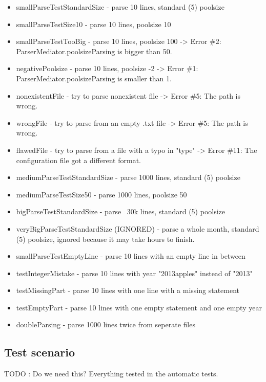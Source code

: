 \begin{itemize}

\item smallParseTestStandardSize - parse 10 lines, standard (5) poolsize
\item smallParseTestSize10 - parse 10 lines, poolsize 10
\item smallParseTestTooBig - parse 10 lines, poolsize 100 -> Error \#2: ParserMediator.poolsizeParsing is bigger than 50.
\item negativePoolsize - parse 10 lines, poolsize -2 -> Error \#1: ParserMediator.poolsizeParsing is smaller than 1.
\item nonexistentFile - try to parse nonexistent file -> Error \#5: The path is wrong.
\item wrongFile - try to parse from an empty .txt file -> Error \#5: The path is wrong.
\item flawedFile - try to parse from a file with a typo in "type" -> Error \#11: The configuration file got a different format.
\item mediumParseTestStandardSize - parse 1000 lines, standard (5) poolsize
\item mediumParseTestSize50 - parse 1000 lines, poolsize 50
\item bigParseTestStandardSize - parse ~30k lines, standard (5) poolsize
\item veryBigParseTestStandardSize (IGNORED) - parse a whole month, standard (5) poolsize, ignored because it may take hours 
to finish.
\item smallParseTestEmptyLine - parse 10 lines with an empty line in between
\item testIntegerMistake - parse 10 lines with year "2013apples" instead of "2013"
\item testMissingPart - parse 10 lines with one line with a missing statement
\item testEmptyPart - parse 10 lines with one empty statement and one empty year
\item doubleParsing - parse 1000 lines twice from seperate files

\end{itemize}

\subsection{Test scenario}
TODO : Do we need this? Everything tested in the automatic tests.
